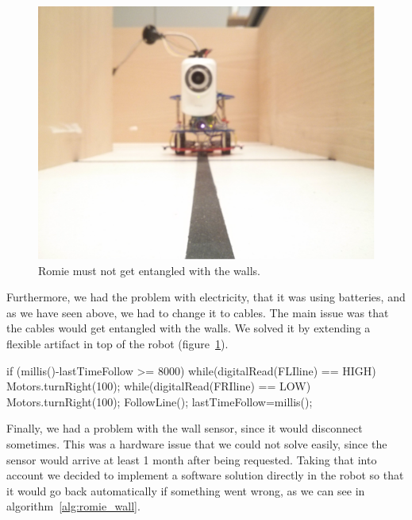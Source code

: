 \begin{figure}[!htbp]
	\centering
	\includegraphics[height=0.35\textheight]{fig/lines}
	\caption{Romie must not get entangled with the walls.}
	\label{fig:lines}
\end{figure}

Furthermore, we had the problem with electricity, that it was using batteries, and as we have seen
above, we had to change it to cables. The main issue was that the cables would get entangled with
the walls. We solved it by extending a flexible artifact in top of the robot
(figure~\ref{fig:lines}).

\begin{center}
\begin{minipage}{.9\textwidth}
\singlespace
{}
\begin{pyglist}[language=c, caption={Arduino code for returning if wall was hit.},
	label={alg:romie_wall}, listingname={Algorithm}, numbers=left]
if (millis()-lastTimeFollow >= 8000) {
    while(digitalRead(FLIline) == HIGH) Motors.turnRight(100);
    while(digitalRead(FRIline) == LOW) Motors.turnRight(100);
    FollowLine();
    lastTimeFollow=millis();
}
\end{pyglist}
\end{minipage}
\end{center}

Finally, we had a problem with the wall sensor, since it would disconnect sometimes. This was a
hardware issue that we could not solve easily, since the sensor would arrive at least 1 month after
being requested. Taking that into account we decided to implement a software solution directly in
the robot so that it would go back automatically if something went wrong, as we can see in
algorithm~\ref{alg:romie_wall}.

